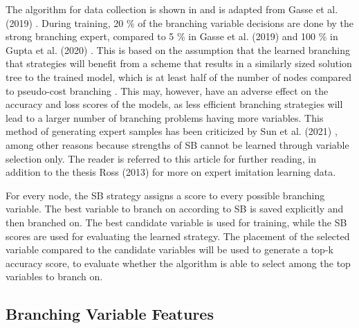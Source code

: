The algorithm for data collection is shown in  and is adapted from Gasse et al. (2019) \cite{gasse2019exact}. During training, 20 \% of the branching variable decisions are done by the strong branching expert, compared to 5 \% in Gasse et al. (2019) \cite{gasse2019exact} and 100 \% in Gupta et al. (2020) \cite{gupta2020hybrid}. This is based on the assumption that the learned branching that strategies will benefit from a scheme that results in a similarly sized solution tree to the trained model, which is at least half of the number of nodes compared to pseudo-cost branching \cite{gasse2019exact}. This may, however, have an adverse effect on the accuracy and loss scores of the models, as less efficient branching strategies will lead to a larger number of branching problems having more variables. This method of generating expert samples has been criticized by Sun et al. (2021) \cite{sun2021improving}, among other reasons because strengths of \gls{SB} cannot be learned through variable selection only. The reader is referred to this article for further reading, in addition to the thesis Ross (2013) \cite{ross2013interactive} for more on expert imitation learning data. 



For every node, the \gls{SB} strategy assigns a score to every possible branching variable. The best variable to branch on according to \gls{SB} is saved explicitly and then branched on. The best candidate variable is used for training, while the \gls{SB} scores are used for evaluating the learned strategy. The placement of the selected variable compared to the candidate variables will be used to generate a top-k accuracy score, to evaluate whether the algorithm is able to select among the top variables to branch on.  


\subsection{Branching Variable Features}

